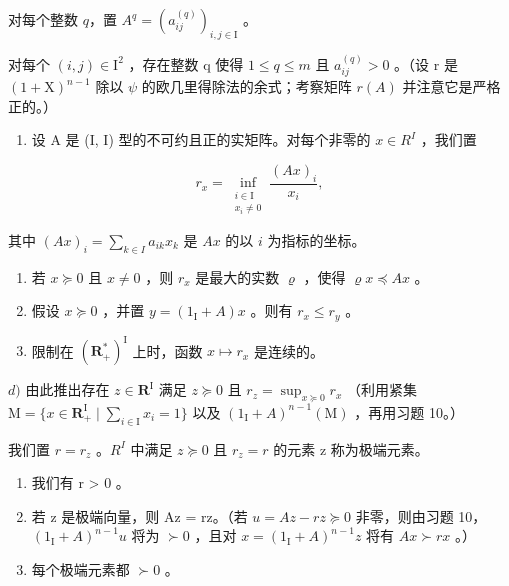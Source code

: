 对每个整数 \(q\)，置 \(A^q = (a_{ij}^{(q)})_{i,j \in \mathrm{I}}\) 。

对每个 \((i,j)\in\mathrm{I}^{2}\) ，存在整数 q 使得 \(1\leqslant q\leqslant m\) 且 \(a_{ij}^{(q)}>0\) 。（设 r 是 \((1+\mathrm{X})^{n-1}\) 除以 \(\psi\) 的欧几里得除法的余式；考察矩阵 \(r(A)\) 并注意它是严格正的。）

\begin{enumerate}
\def\labelenumi{\arabic{enumi})}
\setcounter{enumi}{11}
\tightlist
\item
  设 A 是 (I, I) 型的不可约且正的实矩阵。对每个非零的 \(x \in R^{I}\) ，我们置
\end{enumerate}

\[
r_{x} = \inf_{\substack{i\in \mathrm{I}\\ x_{i}\neq 0}}\frac{(Ax)_{i}}{x_{i}},
\]

其中 \((Ax)_i = \sum_{k\in I}a_{ik}x_k\) 是 \(Ax\) 的以 \(i\) 为指标的坐标。

\begin{enumerate}
\def\labelenumi{\alph{enumi})}
\item
  若 \(x \succcurlyeq 0\) 且 \(x \neq 0\) ，则 \(r_x\) 是最大的实数 \(\varrho\) ，使得 \(\varrho x \preccurlyeq Ax\) 。
\item
  假设 \(x \succcurlyeq 0\) ，并置 \(y = (1_{\mathrm{I}} + A)x\) 。则有 \(r_x \leqslant r_y\) 。
\item
  限制在 \((\mathbf{R}_{+}^{*})^{\mathrm{I}}\) 上时，函数 \(x \mapsto r_{x}\) 是连续的。
\end{enumerate}

\(d)\) 由此推出存在 \(z \in \mathbf{R}^{\mathrm{I}}\) 满足 \(z \succcurlyeq 0\) 且 \(r_z = \sup_{x \succcurlyeq 0} r_x\) （利用紧集 \(\mathrm{M} = \{x \in \mathbf{R}_{+}^{\mathrm{I}} \mid \sum_{i \in \mathrm{I}} x_i = 1\}\) 以及 \((1_{\mathrm{I}} + A)^{n-1}(\mathrm{M})\) ，再用习题 10。）

我们置 \(r = r_{z}\) 。\(R^{I}\) 中满足 \(z \succcurlyeq 0\) 且 \(r_{z} = r\) 的元素 z 称为极端元素。

\begin{enumerate}
\def\labelenumi{\alph{enumi})}
\setcounter{enumi}{4}
\item
  我们有 r \textgreater{} 0 。
\item
  若 z 是极端向量，则 Az = rz。（若 \(u = Az - rz \succcurlyeq 0\) 非零，则由习题 10，\((1_{\mathrm{I}} + A)^{n-1}u\) 将为 \(\succ 0\) ，且对 \(x = (1_{\mathrm{I}} + A)^{n-1}z\) 将有 \(Ax \succ rx\) 。）
\item
  每个极端元素都 \(\succ 0\) 。
\end{enumerate}


